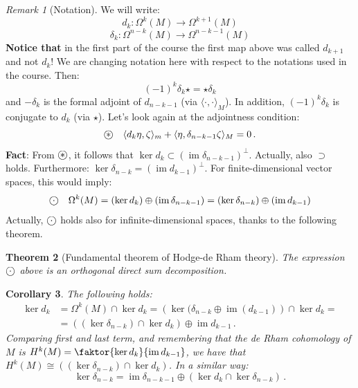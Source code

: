\documentclass[a4paper,11pt,titlepage, article, oneside]{memoir}
\numberwithin{equation}{section}
\newtheorem{theorem}{Theorem}[section]
\newtheorem{corollary}[theorem]{Corollary}
\theoremstyle{definition}
\theoremstyle{remark}
\newtheorem{remark}[theorem]{Remark}
\DeclareMathOperator{\im}{im}
\newcommand\oast{\stackMath\mathbin{\stackinset{c}{0ex}{c}{0ex}{\ast}{\bigcirc}}}
\newcommand\ocdot{\stackMath\mathbin{\stackinset{c}{0ex}{c}{0ex}{\cdot}{\bigcirc}}}
\begin{document}
\begin{remarkbox}\begin{remark}[Notation]
We will write:
$$d_k \colon \Omega^k(M) \rightarrow \Omega^{k+1}(M)$$
$$\delta_k \colon \Omega^{n-k}(M) \rightarrow \Omega^{n-k-1} (M)$$
\textbf{Notice that} in the first part of the course the first map above was called $d_{k+1}$ and not $d_k$! We are changing notation here with respect to the notations used in the course.
Then:
$$(-1)^k \delta_k \star = \star \delta_k$$
and $-\delta_k$ is the formal adjoint of $d_{n-k-1}$ (via $\langle \cdot, \cdot \rangle_M$).  In addition, $(-1)^k \delta_k$ is conjugate to $d_k$ (via $\star$).
Let's look again at the adjointness condition:
\begin{equation} \label{adjcondition}
\oast \quad \langle d_k \eta, \zeta \rangle _m + \langle \eta, \delta_{n-k-1} \zeta \rangle _M = 0 \, .
\end{equation}
\textbf{Fact}: From $\oast$, it follows that $\ker d_k \subset (\im \delta_{n-k-1})^{\bot}$. Actually, also $\supset$ holds. Furthermore: $\ker \delta_{n-k} = (\im d_{k-1})^{\bot}$.
For finite-dimensional vector spaces, this would imply:
\begin{equation}
\ocdot \quad \Omega^k(M) = (\ker d_k) \oplus (\im \delta_{n-k-1}) = (\ker \delta_{n-k}) \oplus (\im d_{k-1})
\end{equation}
Actually, $\ocdot$ holds also for infinite-dimensional spaces, thanks to the following theorem.
\end{remark}\end{remarkbox}

\begin{theorem}[Fundamental theorem of Hodge-de Rham theory]
The expression $\ocdot$ above is an orthogonal direct sum decomposition.
\end{theorem}

\begin{corollary} The following holds:
\begin{align}
\ker d_k &= \Omega^k(M) \cap \ker d_k = \left ( \ker (\delta_{n-k} \oplus \im(d_{k-1}) \right ) \cap \ker d_k = \\
&= \left ( (\ker \delta_{n-k}) \cap \ker d_k \right) \oplus \im d_{k-1} \, . \nonumber
\end{align}
Comparing first and last term, and remembering that the de Rham cohomology of $M$ is $H^{k}(M) = \faktor{\ker d_k}{\im d_{k-1}}$, we have that $H^{k}(M) \cong \left ( (\ker \delta_{n-k}) \cap \ker d_k \right)$. In a similar way:
\begin{equation}
\ker \delta_{n-k} = \im \delta_{n-k-1} \oplus \left ( \ker d_k \cap \ker \delta _{n-k} \right ) \, .
\end{equation}
\end{corollary}
\end{document}

